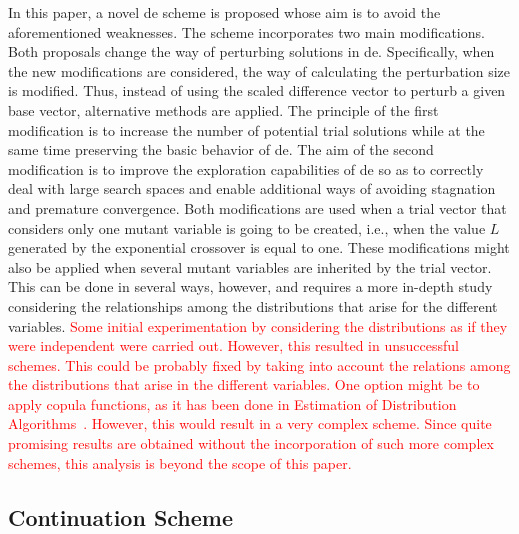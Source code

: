 \documentclass[preprint,3p]{elsarticle}
\newcommand{\DE}{{\sc de}}
\begin{document}
In this paper, a novel \DE{} scheme is proposed whose aim is to avoid the aforementioned weaknesses.
%
The scheme incorporates two main modifications.
%
Both proposals change the way of perturbing solutions in \DE{}.
%
Specifically, when the new modifications are considered, the way of calculating the perturbation size is modified.
%
Thus, instead of using the scaled difference vector to perturb a given base vector, alternative
methods are applied.
%
The principle of the first modification is to increase the number of potential trial solutions while at the same
time preserving the basic behavior of \DE{}.
%
The aim of the second modification is to improve the exploration capabilities of \DE{} so as to
correctly deal with large search spaces and enable additional ways of avoiding stagnation
and premature convergence.
%
Both modifications are used when a trial vector that considers only one mutant variable
is going to be created, i.e., when the value $L$ generated by the exponential crossover is equal to one.
%
%
These modifications might also be applied when several mutant variables are inherited by the trial vector.
%
This can be done in several ways, however, and requires a more in-depth study considering the relationships
among the distributions that arise for the different variables.
%
\textcolor{red}{
Some initial experimentation by considering the distributions as if they were independent were carried out.
%
However, this resulted in unsuccessful schemes.
%
This could be probably fixed by taking into account the relations among the distributions that arise in the different variables.
%
One option might be to apply copula functions, as it has been done in Estimation of Distribution Algorithms~\cite{Rogelio:09}.
%
However, this would result in a very complex scheme.
%
Since quite promising results are obtained without the incorporation of such more complex schemes, 
this analysis is beyond the scope of this paper.
}

\subsection{Continuation Scheme}
\end{document}
